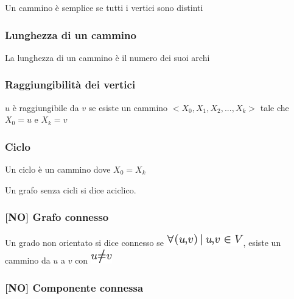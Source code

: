 \documentclass{article}
\begin{document}
{{Un cammino è semplice se tutti i vertici sono distinti}

\hypertarget{h.e18ltelmo48z}{\subsubsection{\texorpdfstring{{Lunghezza
di un cammino}}{Lunghezza di un cammino}}\label{h.e18ltelmo48z}}

{La lunghezza di un cammino è il numero dei suoi archi}

\hypertarget{h.4bm9pdnjdb2q}{\subsubsection{\texorpdfstring{{Raggiungibilità
dei vertici}}{Raggiungibilità dei vertici}}\label{h.4bm9pdnjdb2q}}

$u$ è raggiungibile da $v$ se esiste un cammino $<X_0,X_1,X_2,...,X_k>$ tale che $X_0 = u$ e $X_k = v$

\hypertarget{h.4fm287mz4am5}{\subsubsection{\texorpdfstring{{Ciclo}}{Ciclo}}\label{h.4fm287mz4am5}}

{Un ciclo è un cammino dove $X_0 = X_k$}

{Un grafo senza cicli si dice aciclico.}

\hypertarget{h.rpdf8j1vq7g0}{\subsubsection{\texorpdfstring{{{[}NO{]}
Grafo connesso}}{{[}NO{]} Grafo connesso}}\label{h.rpdf8j1vq7g0}}

{Un grado non orientato si dice connesso se }\includegraphics{images/image354.png}{, esiste un cammino da $u$ a $v$ con }\includegraphics{images/image355.png}

\hypertarget{h.iejp6ankfctp}{\subsubsection{\texorpdfstring{{{[}NO{]} Componente connessa}}{{[}NO{]} Componente connessa}}\label{h.iejp6ankfctp}}

}
\end{document}
